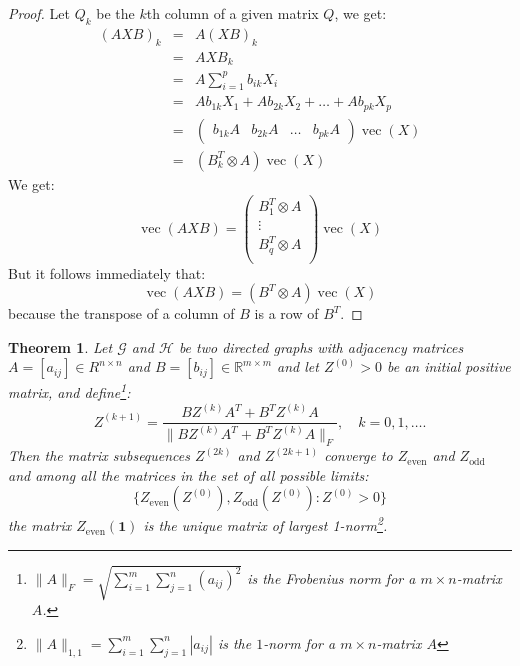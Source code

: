 \documentclass[a4paper,11pt]{report}
\newtheorem{theorem}{Theorem}[section]
\newcommand{\R}{{\mathbb R}}
\newcommand{\graf}{\mathscr{G}}
\newcommand{\grafeen}{\mathscr{H}}
\newcommand{\vect}{\operatorname{vec}}
\begin{document}
\begin{proof}
  Let $Q_k$ be the $k$th column of a given matrix $Q$, we get:
  \begin{eqnarray*}
    (AXB)_k &=& A(XB)_k\\
    &=& AXB_k\\
    &=& A \sum_{i=1}^p b_{ik}X_{i}\\
    &=& Ab_{1k}X_1 + Ab_{2k}X_2 + \ldots + Ab_{pk}X_p\\
    &=& \begin{pmatrix}
    b_{1k}A & b_{2k}A & \ldots & b_{pk}A \end{pmatrix}\vect(X)\\
    &=& (B^T_k \otimes A)\vect(X)
  \end{eqnarray*}
 We get:
 $$\vect(AXB) = \begin{pmatrix} 
 B^T_1 \otimes A\\
 \vdots\\
 B^T_q \otimes A\\
 \end{pmatrix} \vect(X)$$
 But it follows immediately that:
 $$\vect(AXB) = (B^T\otimes A)\vect(X)$$
 because the transpose of a column of $B$ is a row of $B^T$.
\end{proof}

\begin{theorem}\label{frobvorm}
  Let $\graf$ and $\grafeen$ be two directed graphs with adjacency matrices $A = [a_{ij}] \in R^{n\times n}$ 
  and $B = [b_{ij}] \in \R^{m\times m}$ and let $Z^{(0)} > 0$ be an initial positive matrix, and define\footnote{$\|A\|_F = \sqrt{\sum_{i=1}^m\sum_{j=1}^n(a_{ij})^2}$ is the \emph{Frobenius} norm for  a $m\times n$-matrix $A$.}:
  $$Z^{(k+1)} = \frac{BZ^{(k)}A^T + B^TZ^{(k)}A}{\|BZ^{(k)}A^T + B^TZ^{(k)}A\|_F}, \quad k = 
  0,1,\ldots.$$
  Then the matrix subsequences $Z^{(2k)}$ and $Z^{(2k+1)}$ converge to $Z_\text{even}$ 
  and $Z_\text{odd}$ and among all the matrices in the set of all possible 
  limits:
  $$\{Z_\text{even}(Z^{(0)}), Z_\text{odd}(Z^{(0)}): Z^{(0)} > 0 \}$$
  the matrix $Z_\text{even}(\mathbf{1})$ is the unique matrix of largest 1-norm\footnote{$\|A\|_{1,1} = \sum_{i=1}^m\sum_{j=1}^n|a_{ij}|$ is the $1$-norm for a $m\times n$-matrix $A$}.
  \end{theorem}
\end{document}
